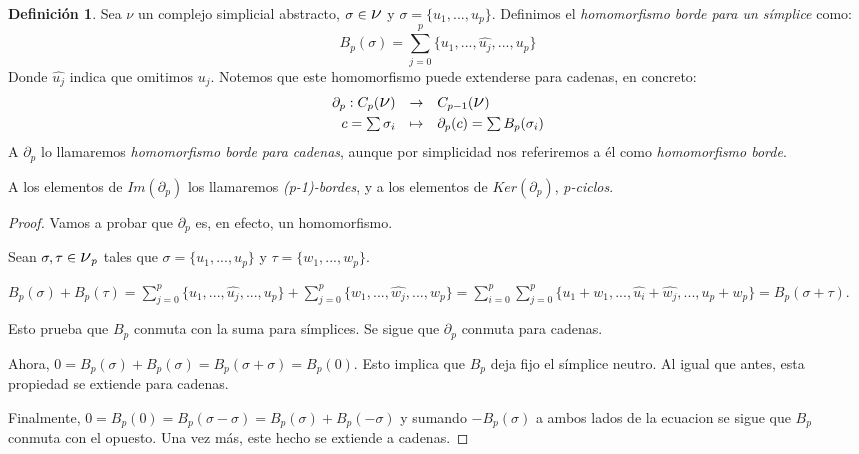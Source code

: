 \documentclass[12pt, a4paper]{article}
\numberwithin{equation}{section}
\theoremstyle{definition}
\newtheorem{defi}{Definición}
\theoremstyle{remark}
\theoremstyle{plain}
\begin{document}
	\begin{defi}
		Sea {\Large $\nu$} un complejo simplicial abstracto, $\sigma 
		\in \text{{\Large $\nu$}}$ y $\sigma = \{u_{1},...,u_{p}\}$. 
		Definimos el \textit{homomorfismo borde para un símplice}
		como:
		$$
		B_{p}(\sigma)=\displaystyle 
		\sum_{j=0}^{p}\{u_{1},...,\widehat{u_{j}},...,u_{p}\}
		$$
 		Donde $\widehat{u_{j}}$ indica que omitimos $u_{j}$. Notemos que este
		homomorfismo puede extenderse para cadenas, en concreto:
	\begin{equation}
		\label{def:borde_form}
		\begin{array}{lll}
			\partial_{p}:C_{p}(\text{{\Large $\nu$}}) & 
				\rightarrow & C_{p-1}(\text{{\Large $\nu$}})
				\\[3pt] 
			\multicolumn{1}{r}{c=\sum\sigma_{i}} & \mapsto & 
			\partial_{p}(c)=\sum B_{p}(\sigma_{i})
		\end{array}
	\end{equation}
	A $\partial_{p}$ lo llamaremos \textit{homomorfismo borde para 
	cadenas}, aunque por simplicidad nos referiremos a él como 
	\textit{homomorfismo borde}.
	
	A los elementos de $Im(\partial_{p})$ los llamaremos 
	\textit{(p-1)-bordes}, y a los elementos de $Ker(\partial_{p})$, 
	\textit{p-ciclos}.
	\end{defi}
	\begin{proof}
		Vamos a probar que $\partial_{p}$ es, en efecto, un 
		homomorfismo.

		Sean $\sigma,\tau \in \text{{\Large $\nu$}}_{p}$ tales que
		$\sigma = \{u_{1},...,u_{p}\}$ y $\tau = \{w_{1},...,w_{p}\}$.

		$B_{p}(\sigma)+B_{p}(\tau)=\displaystyle 
		\sum_{j=0}^{p}\{u_{1},...,\widehat{u_{j}},...,u_{p}\} + 
		\displaystyle \sum_{j=0}^{p}\{w_{1},...,\widehat{w_{j}},...,
		w_{p}\}=\displaystyle \sum_{i=0}^{p}\sum_{j=0}^{p}\{u_{1} + 
		w_{1},...,\widehat{u_{i}} + \widehat{w_{j}},...,u_{p}+w_{p}\}=
		B_{p}(\sigma+\tau)$. 

		Esto prueba que $B_{p}$ conmuta con la suma para 
		símplices. Se sigue que $\partial_{p}$ conmuta 
		para cadenas.

		Ahora, $0=B_{p}(\sigma)+B_{p}(\sigma)=
		B_{p}(\sigma + \sigma)=B_{p}(0)$. Esto implica 
		que $B_{p}$ deja fijo el símplice neutro. Al igual que
		antes, esta propiedad se extiende para cadenas.

		Finalmente, $0=B_{p}(0)=B_{p}(\sigma - \sigma)=
		B_{p}(\sigma)+B_{p}(-\sigma)$ y sumando 
		$-B_{p}(\sigma)$ a ambos lados de la ecuacion se sigue 
		que $B_{p}$ conmuta con el opuesto. Una vez más, este 
		hecho se extiende a cadenas.
	\end{proof}
\end{document}
